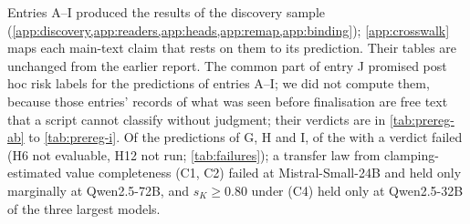 Entries A--I produced the results of the discovery sample (\cref{app:discovery,app:readers,app:heads,app:remap,app:binding}); \cref{app:crosswalk} maps each main-text claim that rests on them to its prediction. Their tables are unchanged from the earlier report. The common part of entry J promised post hoc risk labels for the predictions of entries A--I; we did not compute them, because those entries' records of what was seen before finalisation are free text that a script cannot classify without judgment; their verdicts are in \cref{tab:prereg-ab} to \cref{tab:prereg-i}. Of the \GHIcountPred{} predictions of G, H and I, \GHIcountFailed{} of the \GHIcountVerd{} with a verdict failed (H6 not evaluable, H12 not run; \cref{tab:failures}); a transfer law from clamping-estimated value completeness (C1, C2) failed at Mistral-Small-24B and held only marginally at Qwen2.5-72B, and $s_K \geq 0.80$ under \fmtOpt{} (C4) held only at Qwen2.5-32B of the three largest models.

